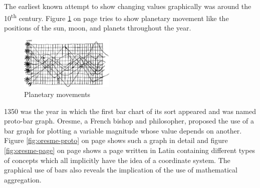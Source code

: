 The earliest known attempt to show changing values graphically was around the 10\textsuperscript{th} century. Figure \ref{fig:planetary-movement} on page \pageref{fig:planetary-movement} tries to show planetary movement like the positions of the sun, moon, and planets throughout the year.

\begin{figure}[!htb]
\centering
\includegraphics[width=0.4\textwidth,keepaspectratio]{images/history/planetary-movement.jpg}
\caption[
    Planetary movements, Urldate: 07.2016 \newline
\small\texttt{\url{http://www.fi.uu.nl/wiskrant/artikelen/hist_grafieken/begin/images/planeten.gif}}
]{Planetary movements}
\label{fig:planetary-movement}
\end{figure}

1350 was the year in which the first bar chart of its sort appeared and was named proto-bar graph. Oresme, a French bishop and philosopher, proposed the use of a bar graph for plotting a variable magnitude whose value depends on another. Figure \ref{fig:oresme-proto} on page \pageref{fig:oresme-proto} shows such a graph in detail and figure \ref{fig:oresme-page} on page \pageref{fig:oresme-page} shows a page written in Latin containing different types of concepts which all implicitly have the idea of a coordinate system. The graphical use of bars also reveals the implication of the use of mathematical aggregation.

